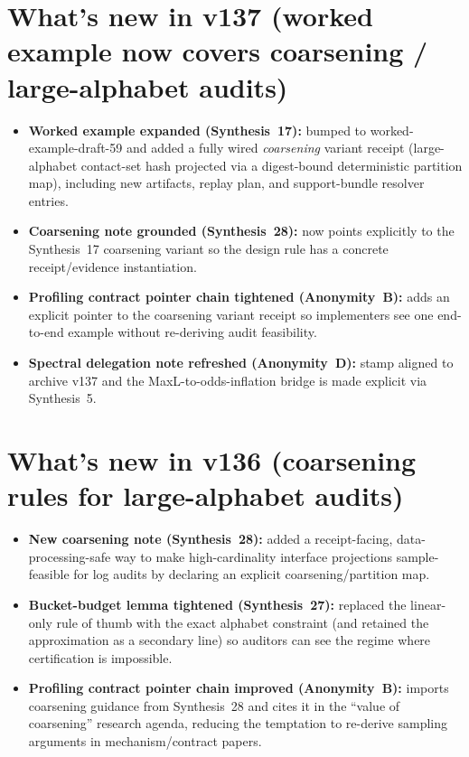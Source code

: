 \documentclass[11pt]{article}
\begin{document}
\section{What's new in v137 (worked example now covers coarsening / large-alphabet audits)}
\begin{itemize}[leftmargin=*]
\item \textbf{Worked example expanded (Synthesis~17):} bumped to worked-example-draft-59 and added a fully wired \emph{coarsening} variant receipt (large-alphabet contact-set hash projected via a digest-bound deterministic partition map), including new artifacts, replay plan, and support-bundle resolver entries.
\item \textbf{Coarsening note grounded (Synthesis~28):} now points explicitly to the Synthesis~17 coarsening variant so the design rule has a concrete receipt/evidence instantiation.
\item \textbf{Profiling contract pointer chain tightened (Anonymity~B):} adds an explicit pointer to the coarsening variant receipt so implementers see one end-to-end example without re-deriving audit feasibility.
\item \textbf{Spectral delegation note refreshed (Anonymity~D):} stamp aligned to archive v137 and the MaxL-to-odds-inflation bridge is made explicit via Synthesis~5.
\end{itemize}

\section{What's new in v136 (coarsening rules for large-alphabet audits)}

\begin{itemize}[leftmargin=*]
\item \textbf{New coarsening note (Synthesis~28):} added a receipt-facing, data-processing-safe way to make high-cardinality interface projections sample-feasible for log audits by declaring an explicit coarsening/partition map.
\item \textbf{Bucket-budget lemma tightened (Synthesis~27):} replaced the linear-only rule of thumb with the exact alphabet constraint (and retained the approximation as a secondary line) so auditors can see the regime where certification is impossible.
\item \textbf{Profiling contract pointer chain improved (Anonymity~B):} imports coarsening guidance from Synthesis~28 and cites it in the ``value of coarsening'' research agenda, reducing the temptation to re-derive sampling arguments in mechanism/contract papers.
\end{itemize}
\end{document}
